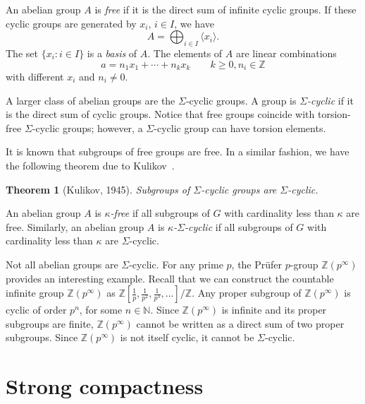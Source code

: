 \documentclass[a4paper]{amsart}
\newtheorem{theorem}{Theorem}[section]
\theoremstyle{definition}
\theoremstyle{remark}
\numberwithin{equation}{section}
\begin{document}
An abelian group \(A\) is \emph{free} if it is the direct sum of infinite cyclic groups. If these cyclic groups are generated by \(x_i\), \(i\in I\), we have 
    \[
    A = \bigoplus_{i\in I}\langle x_i\rangle.
    \]
    The set \(\{x_i: i\in I\}\) is a \emph{basis} of \(A\). The elements of \(A\) are linear combinations
    \[
    a = n_1x_1+\dotsb + n_k x_k \qquad k\geq 0, n_i\in\mathbb{Z}
    \]
    with different \(x_i\) and \(n_i\neq 0\).


A larger class of abelian groups are the $\Sigma$-cyclic groups. A group is \emph{$\Sigma$-cyclic} if it is the direct sum of cyclic groups. Notice that free groups coincide with torsion-free $\Sigma$-cyclic groups; however, a $\Sigma$-cyclic group can have torsion elements. 

It is known that subgroups of free groups are free. In a similar fashion, we have the following theorem due to Kulikov~\cite{Kul45}.


\begin{theorem}[Kulikov, 1945]
\label{thm:Kulikov}
  Subgroups of \(\Sigma\)-cyclic groups are 
    \(\Sigma\)-cyclic.
    \end{theorem}

An abelian group $A$ is \emph{$\kappa$-free} if all subgroups of $G$ with cardinality less than $\kappa$ are free. Similarly, an abelian group $A$ is \emph{$\kappa$-$\Sigma$-cyclic} if all subgroups of $G$ with cardinality less than $\kappa$ are $\Sigma$-cyclic.

Not all abelian groups are \(\Sigma\)-cyclic. For any prime \(p\), the Pr\"ufer $p$-group $\mathbb{Z}(p^{\infty})$ provides an interesting example. Recall that we can construct the countable infinite group $\mathbb{Z}(p^{\infty})$ as $\mathbb{Z}[\frac{1}{p},\frac{1}{p^2},\frac{1}{p^3},\dotsc]/\mathbb{Z}$. 
Any proper subgroup of $\mathbb{Z}(p^{\infty})$ is cyclic of order \(p^n\), for some \(n\in\mathbb{N}\). Since $\mathbb{Z}(p^{\infty})$ is infinite and its proper subgroups are finite, $\mathbb{Z}(p^{\infty})$ cannot be written as a direct sum of two proper subgroups. Since $\mathbb{Z}(p^{\infty})$ is not itself cyclic, it cannot be $\Sigma$-cyclic.



\section{Strong compactness}
\end{document}
